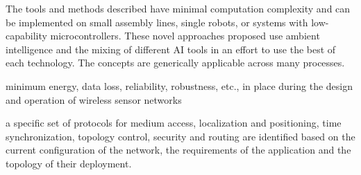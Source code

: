 The tools and methods described have minimal computation complexity and can be implemented on small assembly lines, single robots, or systems with low-capability microcontrollers. These novel approaches proposed use ambient intelligence and the mixing of different AI tools in an effort to use the best of each technology. The concepts are generically applicable across many processes.


minimum energy, data loss, reliability, robustness, etc., in place during the design and operation of wireless sensor networks

a specific set of protocols for medium access, localization and positioning, time synchronization, topology control, security and routing are identified based on the current configuration of the network, the requirements of the application and the topology of their deployment.